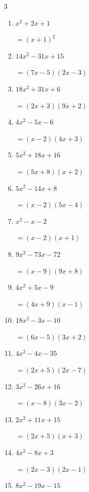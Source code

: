 \begin{multicols}{3}
\begin{enumerate}
        $=(4x+7)(2x-3)$

\columnbreak %

\resetques

  \item $x^{2}+2x+1$

        $=(x+1)^{2}$

  \item $14x^{2}-31x+15$

        $=(7x-5)(2x-3)$

  \item $18x^{2}+31x+6$

        $=(2x+3)(9x+2)$

  \item $4x^{2}-5x-6$

        $=(x-2)(4x+3)$

  \item $5x^{2}+18x+16$

        $=(5x+8)(x+2)$

  \item $5x^{2}-14x+8$

        $=(x-2)(5x-4)$

  \item $x^{2}-x-2$

        $=(x-2)(x+1)$

  \item $9x^{2}-73x-72$

        $=(x-9)(9x+8)$

  \item $4x^{2}+5x-9$

        $=(4x+9)(x-1)$

  \item $18x^{2}-3x-10$

        $=(6x-5)(3x+2)$

\columnbreak %

  \item $4x^{2}-4x-35$

        $=(2x+5)(2x-7)$

  \item $3x^{2}-26x+16$

        $=(x-8)(3x-2)$

  \item $2x^{2}+11x+15$

        $=(2x+5)(x+3)$

  \item $4x^{2}-8x+3$

        $=(2x-3)(2x-1)$

  \item $8x^{2}-19x-15$


\end{enumerate}
\end{multicols}
